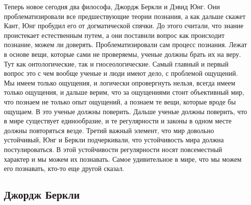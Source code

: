 \documentclass[a4paper, 12pt]{article}
\begin{document}
Теперь новое сегодня два философа, Джордж Беркли и Дэвид Юнг. Они 
проблематизировали все предшествующие теории познания, а как дальше 
скажет Кант, Юнг пробудил его от догматической спячки. До этого считали, 
что знание проистекает естественным путем, а они поставили вопрос как 
происходит познание, можем ли доверять. Проблематизировали сам процесс 
познания. Лежат в основе вещи, которые сами не проверяемы, ученые должны 
брать их на веру. Тут как онтологические, так и гносеологические. Самый 
главный и первый вопрос это с чем вообще ученые и люди имеют дело, 
с проблемой ощущений. Мы имеем только ощущения, и логически опровергнуть 
нельзя, всегда имеем только ощущения, и дальше верим, что за ощущениями 
стоит объективный мир, что познаем не только опыт ощущений, а познаем те 
вещи, которые вроде бы ощущаем. В это ученые должны поверить. Дальше 
ученые должны поверить, что в мире существует единообразие, и те 
регулярности и законы в одном месте должны повторяться везде. Третий 
важный элемент, что мир довольно устойчивый, Юнг и Беркли подчеркивали, 
что устойчивость мира должна постулироваться. В этой устойчивости 
регулярности носят повсеместный характер и мы можем их познавать. Самое 
удивительное в мире, что мы можем его познавать, кто-то еще другой 
сказал.


\subsection{Джордж Беркли}
\end{document}
